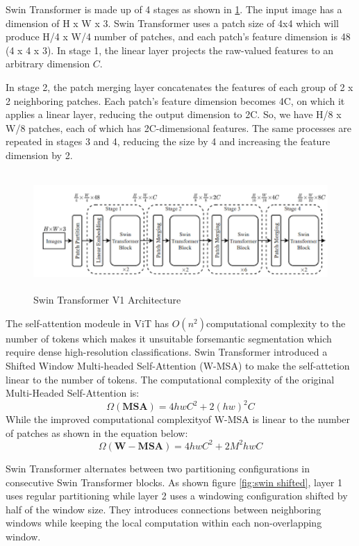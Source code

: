 Swin Transformer is made up of 4 stages as shown in \ref{fig:swin architecture1}. The input image has a dimension of H x W x 3. Swin Transformer uses a patch size of 4x4 which will produce H/4 x W/4 number of patches, and each patch’s feature dimension is 48 (4 x 4 x 3). In stage 1, the linear layer projects the raw-valued features to an arbitrary dimension $C$.

In stage 2, the patch merging layer concatenates the features of each group of 2 x 2 neighboring patches. Each patch’s feature dimension becomes 4C, on which it applies a linear layer, reducing the output dimension to 2C. So, we have H/8 x W/8 patches, each of which has 2C-dimensional features. The same processes are repeated in stages 3 and 4, reducing the size by 4 and increasing the feature dimension by 2.

\FloatBarrier
\begin{figure}[ht]
\includegraphics[width=11.5cm, height=4.5cm]{images/swin-transformer-4block.png}
\centering
\caption{Swin Transformer V1 Architecture}
\label{fig:swin architecture1}
\end{figure}

The self-attention modeule in ViT has $O(n^2) $computational complexity to the number of tokens which makes it unsuitable forsemantic segmentation which require dense high-resolution classifications. Swin Transformer introduced a Shifted Window Multi-headed Self-Attention (W-MSA) to make the self-attetion linear to the number of tokens. The computational complexity of the original Multi-Headed Self-Attention is:
\begin{equation}
    \Omega (\mathbf{MSA}) = 4hwC^2 + 2(hw)^2C
\end{equation}
While the improved computational complexityof W-MSA is linear to the number of patches as shown in the equation below:
\begin{equation}
    \Omega (\mathbf{W-MSA}) = 4hwC^2 + 2M^2hwC
\end{equation}

Swin Transformer alternates between two partitioning configurations in consecutive Swin Transformer blocks. As shown figure \ref{fig:swin shifted}, layer 1 uses regular partitioning while layer 2 uses a windowing configuration shifted by half of the window size. They introduces connections between neighboring windows while keeping the local computation within each non-overlapping window.

